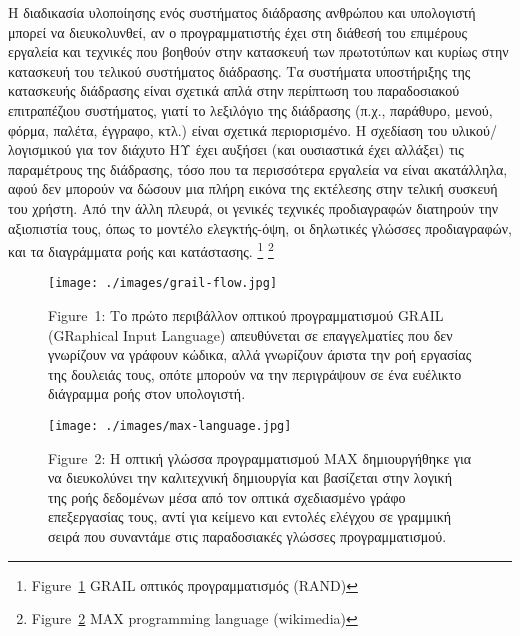 \documentclass[
]{article}
\begin{document}
Η διαδικασία υλοποίησης ενός συστήματος διάδρασης ανθρώπου και
υπολογιστή μπορεί να διευκολυνθεί, αν ο προγραμματιστής έχει στη διάθεσή
του επιμέρους εργαλεία και τεχνικές που βοηθούν στην κατασκευή των
πρωτοτύπων και κυρίως στην κατασκευή του τελικού συστήματος διάδρασης.
Τα συστήματα υποστήριξης της κατασκευής διάδρασης είναι σχετικά απλά
στην περίπτωση του παραδοσιακού επιτραπέζιου συστήματος, γιατί το
λεξιλόγιο της διάδρασης (π.χ., παράθυρο, μενού, φόρμα, παλέτα, έγγραφο,
κτλ.) είναι σχετικά περιορισμένο. Η σχεδίαση του υλικού/λογισμικού για
τον διάχυτο ΗΥ έχει αυξήσει (και ουσιαστικά έχει αλλάξει) τις
παραμέτρους της διάδρασης, τόσο που τα περισσότερα εργαλεία να είναι
ακατάλληλα, αφού δεν μπορούν να δώσουν μια πλήρη εικόνα της εκτέλεσης
στην τελική συσκευή του χρήστη. Από την άλλη πλευρά, οι γενικές τεχνικές
προδιαγραφών διατηρούν την αξιοπιστία τους, όπως το μοντέλο
ελεγκτής-όψη, οι δηλωτικές γλώσσες προδιαγραφών, και τα διαγράμματα ροής
και κατάστασης. \footnote{Figure~\protect\hyperlink{fig:grail-flow}{1}
  GRAIL οπτικός προγραμματισμός (RAND)} \footnote{Figure~\protect\hyperlink{fig:max-language}{2}
  MAX programming language (wikimedia)}

\leavevmode{}%
\begin{figure}
\hypertarget{fig:grail-flow}{%
\centering
\texttt{[image: ./images/grail-flow.jpg]}
\caption{Figure~1: Το πρώτο περιβάλλον οπτικού προγραμματισμού GRAIL
(GRaphical Input Language) απευθύνεται σε επαγγελματίες που δεν
γνωρίζουν να γράφουν κώδικα, αλλά γνωρίζουν άριστα την ροή εργασίας της
δουλειάς τους, οπότε μπορούν να την περιγράψουν σε ένα ευέλικτο
διάγραμμα ροής στον υπολογιστή.}\label{fig:grail-flow}
}
\end{figure}

\leavevmode{}%
\begin{figure}
\hypertarget{fig:max-language}{%
\centering
\texttt{[image: ./images/max-language.jpg]}
\caption{Figure~2: Η οπτική γλώσσα προγραμματισμού MAX δημιουργήθηκε για
να διευκολύνει την καλιτεχνική δημιουργία και βασίζεται στην λογική της
ροής δεδομένων μέσα από τον οπτικά σχεδιασμένο γράφο επεξεργασίας τους,
αντί για κείμενο και εντολές ελέγχου σε γραμμική σειρά που συναντάμε
στις παραδοσιακές γλώσσες προγραμματισμού.}\label{fig:max-language}
}
\end{figure}
\end{document}
